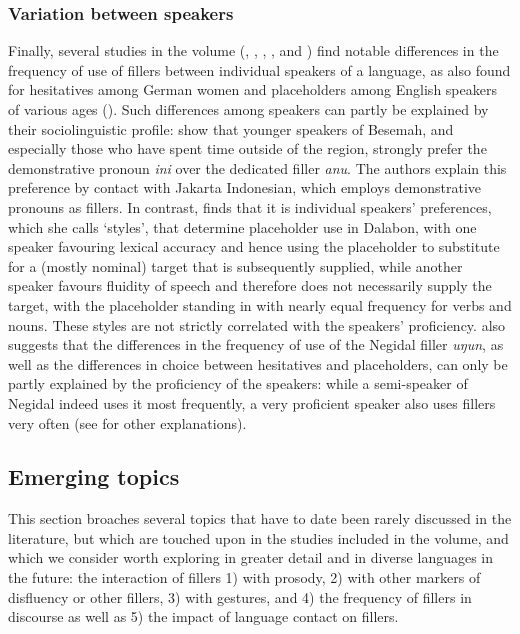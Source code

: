\documentclass[output=paper]{langscibook}
\begin{document}
\subsubsection{Variation between speakers}\label{sec:intro:9.2.4}

Finally, several studies in the volume (\citeauthor{chapters/pakendorf}, \citeauthor{chapters/ventayol_boada}, \citeauthor{chapters/mcdonnell_billings}, \citeauthor{chapters/visser}, and \citeauthor{chapters/ponsonnet}) find notable differences in the frequency of use of fillers between individual speakers of a language, as also found for hesitatives among German women \citep{Braun2023} and placeholders among English speakers of various ages (\citealt{Palacios_martinez2015}). Such differences among speakers can partly be explained by their sociolinguistic profile: \citeauthor{chapters/mcdonnell_billings} show that younger speakers of Besemah, and especially those who have spent time outside of the region, strongly prefer the demonstrative pronoun \textit{ini} over the dedicated filler \textit{anu}. The authors explain this preference by contact with Jakarta Indonesian, which employs demonstrative pronouns as fillers. In contrast, \citeauthor{chapters/ponsonnet} finds that it is individual speakers’ preferences, which she calls ‘styles’, that determine placeholder use in Dalabon, with one speaker favouring lexical accuracy and hence using the placeholder to substitute for a (mostly nominal) target that is subsequently supplied, while another speaker favours fluidity of speech and therefore does not necessarily supply the target, with the placeholder standing in with nearly equal frequency for verbs and nouns. These styles are not strictly correlated with the speakers’ proficiency. \citeauthor{chapters/pakendorf} also suggests that the differences in the frequency of use of the Negidal filler \textit{uŋun}, as well as the differences in choice between hesitatives and placeholders, can only be partly explained by the proficiency of the speakers: while a semi-speaker of Negidal indeed uses it most frequently, a very proficient speaker also uses fillers very often (see  for other explanations).

\subsection{Emerging topics}\label{sec:intro:9.3}
This section broaches several topics that have to date been rarely discussed in the literature, but which are touched upon in the studies included in the volume, and which we consider worth exploring in greater detail and in diverse languages in the future: the interaction of fillers 1) with prosody, 2) with other markers of disfluency or other fillers, 3) with gestures, and 4) the frequency of fillers in discourse as well as 5) the impact of language contact on fillers. 
\end{document}
